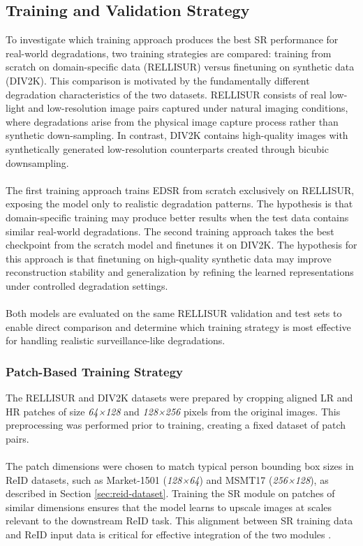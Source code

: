 \subsection{Training and Validation Strategy}\label{SRtrainingdata}
To investigate which training approach produces the best \acs{SR} performance for real-world degradations, two training strategies are compared: training from scratch on domain-specific data (\acs{RELLISUR}) versus finetuning on synthetic data (\acs{DIV2K}). This comparison is motivated by the fundamentally different degradation characteristics of the two datasets. \acs{RELLISUR} consists of real low-light and low-resolution image pairs captured under natural imaging conditions, where degradations arise from the physical image capture process rather than synthetic down-sampling. In contrast, \acs{DIV2K} contains high-quality images with synthetically generated low-resolution counterparts created through bicubic downsampling.
\\\\
The first training approach trains \acs{EDSR} from scratch exclusively on \acs{RELLISUR}, exposing the model only to realistic degradation patterns. The hypothesis is that domain-specific training may produce better results when the test data contains similar real-world degradations. The second training approach takes the best checkpoint from the scratch model and finetunes it on \acs{DIV2K}. The hypothesis for this approach is that finetuning on high-quality synthetic data may improve reconstruction stability and generalization by refining the learned representations under controlled degradation settings.
\\\\
Both models are evaluated on the same \acs{RELLISUR} validation and test sets to enable direct comparison and determine which training strategy is most effective for handling realistic surveillance-like degradations.

\subsubsection{Patch-Based Training Strategy}
The \acs{RELLISUR} and \acs{DIV2K} datasets were prepared by cropping aligned \acs{LR} and \acs{HR} patches of size \textit{64×128} and \textit{128×256} pixels from the original images. This preprocessing was performed prior to training, creating a fixed dataset of patch pairs.
\\\\
The patch dimensions were chosen to match typical person bounding box sizes in \acs{ReID} datasets, such as Market-1501 (\textit{128×64}) and \acs{MSMT17} (\textit{256×128}), as described in Section \ref{sec:reid-dataset}. Training the \acs{SR} module on patches of similar dimensions ensures that the model learns to upscale images at scales relevant to the downstream \acs{ReID} task. This alignment between \acs{SR} training data and \acs{ReID} input data is critical for effective integration of the two modules \cite{lim2017edsr}.


